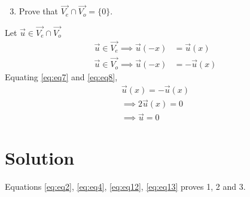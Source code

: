 \documentclass[journal,12pt,twocolumn]{IEEEtran}
\begin{document}
\begin{enumerate}
    \setcounter{enumi}{2}
   \item Prove that $\vec{V_e} \cap \vec{V_o} = \{0\}$.
 \end{enumerate}
Let $\vec{u} \in \vec{V_e} \cap \vec{V_o}$
\begin{align}
    \vec{u} \in \vec{V_e} \implies \vec{u}(-x) &= \vec{u}(x) \label{eq:eq7}\\
    \vec{u} \in \vec{V_o} \implies \vec{u}(-x) &= -\vec{u}(x) \label{eq:eq8}
\end{align}
Equating \eqref{eq:eq7} and \eqref{eq:eq8},
\begin{align}
    \vec{u}(x) = -\vec{u}(x)\\
    \implies 2\vec{u}(x)=0\\
    \implies \vec{u}=0 \label{eq:eq13}
\end{align}
\section{Solution}
Equations \eqref{eq:eq2}, \eqref{eq:eq4}, \eqref{eq:eq12}, \eqref{eq:eq13} proves 1, 2 and 3.
\\
\end{document}
